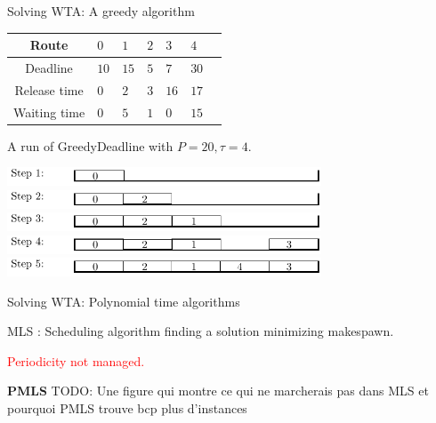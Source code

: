 \documentclass[10 pt]{beamer}
\newcommand{\todo}[1]{{\color{red} TODO: {#1}}}
\begin{document}
\begin{frame}{Solving WTA: A greedy algorithm}

          \begin{center}
   \begin{tabularx}{0.7\textwidth}{|c|X|X|X|X|X|X|}
    \hline
     Route& $0$ & $1$ & $2$& $3$ & $4$\\
    \hline
    Deadline & $10$ &$15$&$5$&$7$&$30$\\
    \hline
     Release time & $0$ &$2$&$3$&$16$&$17$\\
    \hline
    Waiting time & $0$ &$5$&$1$&$0$&$15$\\
    \hline
      \end{tabularx}

\vspace{1cm}
      
       A run of GreedyDeadline with $P = 20, \tau = 4$.

      \includegraphics[width=0.7\textwidth]{greedy1.pdf}
\pause
\includegraphics[width=0.7\textwidth]{greedy2.pdf}
\pause
\includegraphics[width=0.7\textwidth]{greedy3.pdf}
\pause
\includegraphics[width=0.7\textwidth]{greedy4.pdf}
\pause
\includegraphics[width=0.7\textwidth]{greedy5.pdf}

 
      \end{center}
\end{frame}


\begin{frame}{Solving WTA: Polynomial time algorithms}

          \begin{center}
  \pause
   MLS : Scheduling algorithm finding a solution minimizing makespawn. 

   \pause
   \textcolor{red}{Periodicity not managed.}      \end{center}

   \pause 
   \textbf{PMLS} \todo{Une figure qui montre ce qui ne marcherais pas dans MLS et pourquoi PMLS trouve bcp plus d'instances}
\end{frame}
\end{document}
